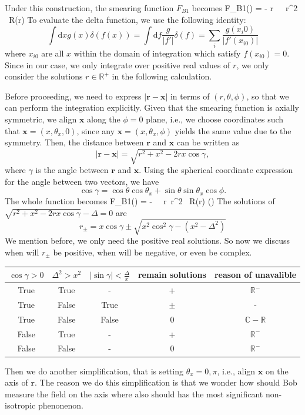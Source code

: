 \documentclass[a4paper,12pt]{article}
\begin{document}
Under this construction, the smearing function $F_{B1}$ becomes
\be
    F_{B1}() = - \int {}r\, \theta\, \phi\, r^2 \sin{\theta} \, R(r)\frac{\delta(\theta)}{\sin{\theta}} 
\ee
To evaluate the delta function, we use the following identity:
\[
    \int \mathrm{d}x g(x) \delta(f(x)) = \int \mathrm{d}f \frac{g}{\left|f'\right|} \delta(f) = \sum_i\frac{g(x_i0)}{\left|f'(x_{i0})\right|}
\]
where $x_{i0}$ are all $x$ within the domain of integration which satisfy $f(x_{i0}) = 0$. Since in our case, we only integrate over positive real values of $r$, we only consider the solutions $r \in \mathbb{R}^+$ in the following calculation.

Before proceeding, we need to express $|\mathbf{r} - \mathbf{x}|$ in terms of $(r, \theta, \phi)$, so that we can perform the integration explicitly. Given that the smearing function is axially symmetric, we align $\mathbf{x}$ along the $\phi = 0$ plane, i.e., we choose coordinates such that $\mathbf{x} = (x, \theta_x, 0)$, since any $\mathbf{x} = (x, \theta_x, \phi)$ yields the same value due to the symmetry. Then, the distance between $\mathbf{r}$ and $\mathbf{x}$ can be written as
\[
|\mathbf{r} - \mathbf{x}| = \sqrt{r^2 + x^2 - 2rx \cos\gamma},
\]
where $\gamma$ is the angle between $\mathbf{r}$ and $\mathbf{x}$. Using the spherical coordinate expression for the angle between two vectors, we have
\[
\cos\gamma = \cos\theta \cos\theta_x + \sin\theta \sin\theta_x \cos\phi.
\]
The whole function becomes
\be
    F_{B1}() = - \int {}\theta\, \phi\, r\, r^2 \, R(r) \delta(\theta) 
\ee
The solutions of $\sqrt{r^2 + x^2 - 2rx \cos\gamma} - \Delta = 0$ are
\[
    r_\pm = x\cos\gamma \pm \sqrt{x^2 \cos^2\gamma - (x^2 - \Delta^2)}
\]
We mention before, we only need the positive real solutions. So now we discuss when will $r_\pm$ be positive, when will be negative, or even be complex.
\begin{center}
  \begin{tabular}{|c|c|c|c|c|}
    \hline
    $\cos{\gamma} > 0$ & $\Delta^2 > x^2$ & $\left|\sin\gamma\right| < \frac{\Delta}{x}$ & remain solutions & reason of unavalible\\
    \hline\hline
    True & True & - & + & $\mathbb{R^-}$\\
    True & False & True & $\pm$ & -\\
    True & False & False & 0 & $\mathbb{C-R}$\\
    False & True & - & + & $\mathbb{R^-}$\\
    False & False & - & 0 & $\mathbb{R^-}$\\
    \hline
  \end{tabular}
\end{center}
Then we do another simplification, that is setting $\theta_x = 0, \pi$, i.e., align $\mathbf{x}$ on the axis of $\mathbf{r}$. The reason we do this simplification is that we wonder how should Bob measure the field on the axis where also should has the most significant non-isotropic phenonenon.
\end{document}
